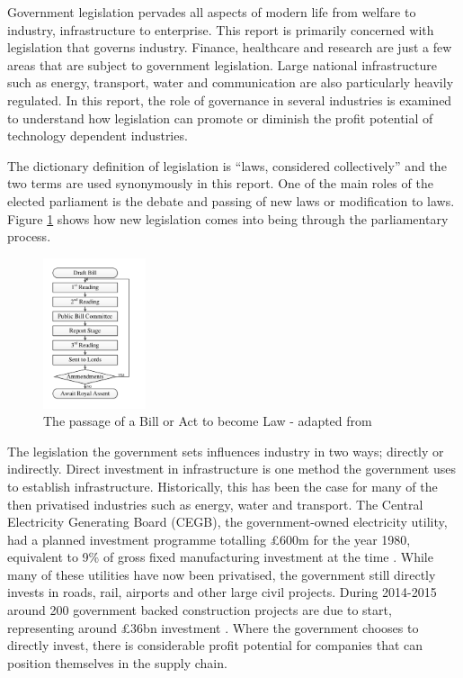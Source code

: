 
{}

Government legislation pervades all aspects of modern life from welfare to industry, infrastructure to enterprise.
This report is primarily concerned with legislation that governs industry.
Finance, healthcare and research are just a few areas that are subject to government legislation.
Large national infrastructure such as energy, transport, water and communication are also particularly heavily regulated.
In this report, the role of governance in several industries is examined to understand how legislation can promote or diminish the profit potential of technology dependent industries.

The dictionary definition of legislation is ``laws, considered collectively'' \cite{OED} and the two terms are used synonymously in this report.
One of the main roles of the elected parliament is the debate and passing of new laws or modification to laws.
Figure \ref{figure:passage} shows how new legislation comes into being through the parliamentary process.

\begin{figure}[!h]
\centering
\includegraphics[width = 0.27\textwidth]{Figures/BillFormulation.pdf}
\caption{The passage of a Bill or Act to become Law - adapted from \cite{Factsheet2010}}
\label{figure:passage}
\end{figure}

The legislation the government sets influences industry in two ways; directly or indirectly.
Direct investment in infrastructure is one method the government uses to establish infrastructure.
Historically, this has been the case for many of the then privatised industries such as energy, water and transport.
The Central Electricity Generating Board (CEGB), the government-owned electricity utility, had a planned investment programme totalling \pounds600m for the year 1980, equivalent to 9\% of gross fixed manufacturing investment at the time \cite{CEGB1980}.
While many of these utilities have now been privatised, the government still directly invests in roads, rail, airports and other large civil projects.
During 2014-2015 around 200 government backed construction projects are due to start, representing around \pounds36bn investment \cite{GovPress2014}.
Where the government chooses to directly invest, there is considerable profit potential for companies that can position themselves in the supply chain. 

